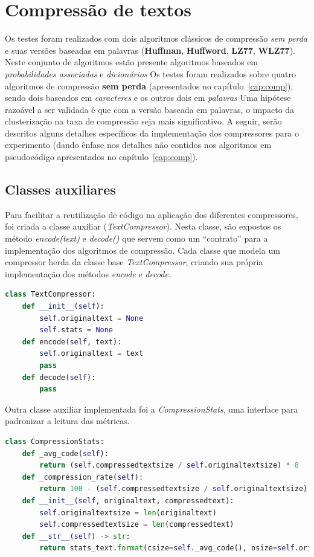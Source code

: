 \section{Compressão de textos}
Os testes foram realizados com dois algoritmos clássicos de compressão \emph{sem perda} e suas versões baseadas em palavras (\textbf{Huffman}, \textbf{Huffword}, \textbf{LZ77}, \textbf{WLZ77}).
Neste conjunto de algoritmos estão presente algoritmos baseados em \emph{probabilidades associadas} e \emph{dicionários}
Os testes foram realizados sobre quatro algoritmos de compressão \textbf{sem perda} (apresentados no capítulo~\ref{cap:comp}), sendo dois baseados em \emph{caracteres} e os outros dois em \emph{palavras}
Uma hipótese razoável a ser validada é que com a versão baseada em palavras, o impacto da clusterização na taxa de compressão seja mais significativo.
A seguir, serão descritos alguns detalhes específicos da implementação dos compressores para o experimento (dando ênfase nos detalhes não contidos nos algoritmos em pseudocódigo apresentados no capítulo~\ref{cap:comp}).

\subsection{Classes auxiliares}
Para facilitar a reutilização de código na aplicação dos diferentes compressores, foi criada a classe auxiliar (\emph{TextCompressor}).
Nesta classe, são expostos os método \emph{encode(text)} e \emph{decode()} que servem como um ``contrato'' para a implementação dos algoritmos de compressão.
Cada classe que modela um compressor herda da classe base \emph{TextCompressor}, criando sua própria implementação dos métodos \emph{encode} e \emph{decode}.


\begin{lstlisting}[language=Python, caption=Classe TextCompressor]
class TextCompressor:
    def __init__(self):
        self.originaltext = None
        self.stats = None
    def encode(self, text):
        self.originaltext = text
        pass
    def decode(self):
        pass
\end{lstlisting}

Outra classe auxiliar implementada foi a \emph{CompressionStats}, uma interface para padronizar a leitura das métricas.

\begin{lstlisting}[language=Python, caption=Implementaçào da classe base CompressionStats]
class CompressionStats:
    def _avg_code(self):
        return (self.compressedtextsize / self.originaltextsize) * 8
    def _compression_rate(self):
        return 100 - (self.compressedtextsize / self.originaltextsize) * 100
    def __init__(self, originaltext, compressedtext):
        self.originaltextsize = len(originaltext)
        self.compressedtextsize = len(compressedtext)
    def __str__(self) -> str:
        return stats_text.format(csize=self._avg_code(), osize=self.originaltextsize, nsize=self.compressedtextsize, crate=self._compression_rate())
\end{lstlisting}


